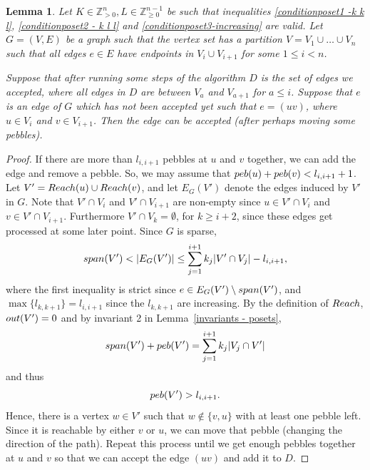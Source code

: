 \documentclass[10pt,a4paper]{article}
\newtheorem{lemma}[theorem]{Lemma}
\newtheorem{rem
ark}[theorem]{Remark}
\newcommand{\out}{\textup{out}}
\newcommand{\spa}{\textup{span}}
\newcommand{\peb}{\textup{peb}}
\begin{document}
\begin{lemma}\label{lemma-add-edge(poset)}
 Let $K\in \mathbb{Z}_{>0}^{n}, L\in \mathbb{Z}_{\geq 0}^{n-1}$ be such that inequalities \eqref{conditionposet1 -k k l}, \eqref{conditionposet2 - k l l} and \eqref{conditionposet3-increasing} are valid. Let $G=(V,E)$ be a graph such that the vertex set has a partition $V=V_1\cup \dots \cup V_n$ such that all edges $e\in E$ have endpoints in $V_{i} \cup V_{i+1}$ for some $1 \leq i < n$. 
 
Suppose that after running some steps of the algorithm $D$ is the set of edges we accepted, where all edges in $D$ are between $V_a$ and $V_{a+1}$ for $a\leq i$. Suppose that $e$ is an edge of $G$ which has not been accepted yet such that $e=(uv)$, where $u\in V_i$ and $v\in V_{i+1}$. Then the edge can be accepted (after perhaps moving some pebbles).
\end{lemma}

\begin{proof}
If there are more than $l_{i, i+1}$ pebbles at $u$ and $v$ together, we can add the edge and remove a pebble. So, we may assume that $\peb(u)+\peb(v)<l_{i, i+1}+1$.
Let $V'=\textup{Reach}(u)\cup \textup{Reach}(v)$, and let $E_G(V')$ denote the edges induced by $V'$ in $G$. Note that $V'\cap V_i$ and $V'\cap  V_{i+1}$ are non-empty since $u\in V'\cap V_i$ and $v\in V'\cap V_{i+1}$. Furthermore $V'\cap V_k =\emptyset$, for $k\geq i+2$, since these edges get processed at some later point. Since $G$ is sparse, $$\spa(V')< \vert E_G(V') \vert \leq \sum_{j=1}^{i+1}k_j\vert V' \cap V_j  \vert - l_{i,i+1},$$ where the first inequality is strict since $e\in  E_G(V') \setminus \spa(V')$, and $\max\{l_{k,k+1}\}=l_{i,i+1}$ since the $l_{k,k+1}$ are increasing. By the definition of $\textup{Reach}$, $\out(V')=0$ and by invariant 2 in Lemma~\ref{invariants - posets}, 
\[
\spa(V')+ \peb(V')= \sum_{j=1}^{i+1}k_j\vert V_j \cap V' \vert
\]
and thus
\[
\peb(V') > l_{i, i+1} .
\]
Hence, there is a vertex $w\in V'$ such that $w\notin \{v,u\}$ with at least one pebble left. Since it is reachable by either $v$ or $u$, we can move that pebble (changing the direction of the path). Repeat this process until we get enough pebbles together at $u$ and $v$ so that we can accept the edge $(uv)$ and add it to $D$.
\end{proof}
\end{document}
